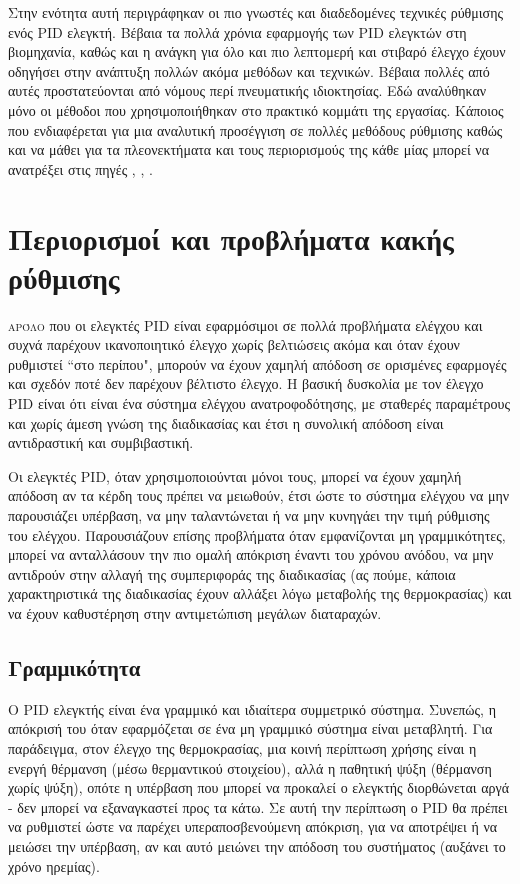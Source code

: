 Στην ενότητα αυτή περιγράφηκαν οι πιο γνωστές και διαδεδομένες τεχνικές ρύθμισης ενός PID ελεγκτή. Βέβαια τα πολλά χρόνια εφαρμογής των PID ελεγκτών στη βιομηχανία, καθώς και η ανάγκη για όλο και πιο λεπτομερή και στιβαρό έλεγχο έχουν οδηγήσει στην ανάπτυξη πολλών ακόμα μεθόδων και τεχνικών. Βέβαια πολλές από αυτές προστατεύονται από νόμους περί πνευματικής ιδιοκτησίας. Εδώ αναλύθηκαν μόνο οι μέθοδοι που χρησιμοποιήθηκαν στο πρακτικό κομμάτι της εργασίας. Κάποιος που ενδιαφέρεται για μια αναλυτική προσέγγιση σε πολλές μεθόδους ρύθμισης καθώς και να μάθει για τα πλεονεκτήματα και τους περιορισμούς της κάθε μίας μπορεί να ανατρέξει στις πηγές \cite{astrom}, \cite{yun}, \cite{kristian}.

\section{Περιορισμοί και προβλήματα κακής ρύθμισης}

\lettrine[findent=2pt]{}{αρόλο} που οι ελεγκτές PID είναι εφαρμόσιμοι σε πολλά προβλήματα ελέγχου και συχνά παρέχουν ικανοποιητικό έλεγχο χωρίς βελτιώσεις ακόμα και όταν έχουν ρυθμιστεί ``στο περίπου", μπορούν να έχουν χαμηλή απόδοση σε ορισμένες εφαρμογές και σχεδόν ποτέ δεν παρέχουν βέλτιστο έλεγχο. Η βασική δυσκολία με τον έλεγχο PID είναι ότι είναι ένα σύστημα ελέγχου ανατροφοδότησης, με σταθερές παραμέτρους και χωρίς άμεση γνώση της διαδικασίας και έτσι η συνολική απόδοση είναι αντιδραστική και συμβιβαστική.

Οι ελεγκτές PID, όταν χρησιμοποιούνται μόνοι τους, μπορεί να έχουν χαμηλή απόδοση αν τα κέρδη τους πρέπει να μειωθούν, έτσι ώστε το σύστημα ελέγχου να μην παρουσιάζει υπέρβαση, να μην ταλαντώνεται ή να μην κυνηγάει την τιμή ρύθμισης του ελέγχου. Παρουσιάζουν επίσης προβλήματα όταν εμφανίζονται μη γραμμικότητες, μπορεί να ανταλλάσουν την πιο ομαλή απόκριση έναντι του χρόνου ανόδου, να μην αντιδρούν στην αλλαγή της συμπεριφοράς της διαδικασίας (ας πούμε, κάποια χαρακτηριστικά της διαδικασίας έχουν αλλάξει λόγω μεταβολής της θερμοκρασίας) και να έχουν καθυστέρηση στην αντιμετώπιση μεγάλων διαταραχών.

\subsection{Γραμμικότητα}

Ο PID ελεγκτής είναι ένα γραμμικό και ιδιαίτερα συμμετρικό σύστημα. Συνεπώς, η απόκρισή του όταν εφαρμόζεται σε ένα μη γραμμικό σύστημα είναι μεταβλητή. Για παράδειγμα, στον έλεγχο της θερμοκρασίας, μια κοινή περίπτωση χρήσης είναι η ενεργή θέρμανση (μέσω θερμαντικού στοιχείου), αλλά η παθητική ψύξη (θέρμανση χωρίς ψύξη), οπότε η υπέρβαση που μπορεί να προκαλεί ο ελεγκτής διορθώνεται αργά - δεν μπορεί να εξαναγκαστεί προς τα κάτω. Σε αυτή την περίπτωση ο PID θα πρέπει να ρυθμιστεί ώστε να παρέχει υπεραποσβενούμενη απόκριση, για να αποτρέψει ή να μειώσει την υπέρβαση, αν και αυτό μειώνει την απόδοση του συστήματος (αυξάνει το χρόνο ηρεμίας).

